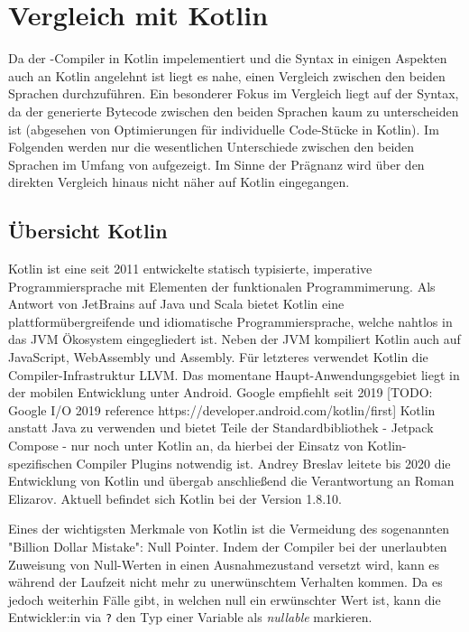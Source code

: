 \chapter{Vergleich mit Kotlin}
\label{cha:comparison}

Da der \toya-Compiler in Kotlin impelementiert und die Syntax in einigen Aspekten auch an Kotlin angelehnt ist liegt es nahe, einen Vergleich zwischen den beiden Sprachen durchzuführen. Ein besonderer Fokus im Vergleich liegt auf der Syntax, da der generierte Bytecode zwischen den beiden Sprachen kaum zu unterscheiden ist (abgesehen von Optimierungen für individuelle Code-Stücke in Kotlin). Im Folgenden werden nur die wesentlichen Unterschiede zwischen den beiden Sprachen im Umfang von \toya aufgezeigt. Im Sinne der Prägnanz wird über den direkten Vergleich hinaus nicht näher auf Kotlin eingegangen.

\section{Übersicht Kotlin}
Kotlin ist eine seit 2011 entwickelte statisch typisierte, imperative Programmiersprache mit Elementen der funktionalen Programmimerung. Als Antwort von JetBrains auf Java und Scala bietet Kotlin eine plattformübergreifende und idiomatische Programmiersprache, welche nahtlos in das JVM Ökosystem eingegliedert ist. Neben der JVM kompiliert Kotlin auch auf JavaScript, WebAssembly und Assembly. Für letzteres verwendet Kotlin die Compiler-Infrastruktur LLVM. Das momentane Haupt-Anwendungsgebiet liegt in der mobilen Entwicklung unter Android. Google empfiehlt seit 2019 [TODO: Google I/O 2019 reference https://developer.android.com/kotlin/first] Kotlin anstatt Java zu verwenden und bietet Teile der Standardbibliothek - Jetpack Compose - nur noch unter Kotlin an, da hierbei der Einsatz von Kotlin-spezifischen Compiler Plugins notwendig ist. Andrey Breslav leitete bis 2020 die Entwicklung von Kotlin und übergab anschließend die Verantwortung an Roman Elizarov. Aktuell befindet sich Kotlin bei der Version 1.8.10.

Eines der wichtigsten Merkmale von Kotlin ist die Vermeidung des sogenannten "Billion Dollar Mistake": Null Pointer. Indem der Compiler bei der unerlaubten Zuweisung von Null-Werten in einen Ausnahmezustand versetzt wird, kann es während der Laufzeit nicht mehr zu unerwünschtem Verhalten kommen. Da es jedoch weiterhin Fälle gibt, in welchen null ein erwünschter Wert ist, kann die Entwickler:in via \texttt{?} den Typ einer Variable als \textit{nullable} markieren.

